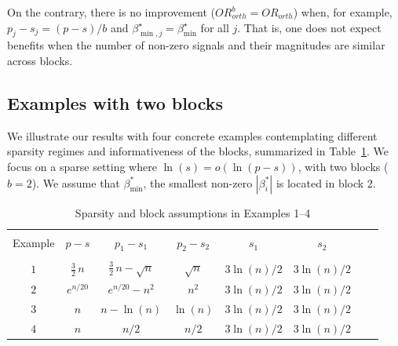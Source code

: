 \documentclass[aos]{imsart}
\theoremstyle{plain}
\begin{document}
On the contrary, there is no improvement 
(${OR}^b_{orth}={OR}_{orth}$) 
when, for example, %
$p_j-s_j=(p-s)/b$ 
 and $\beta^\star_{\min,j}=\beta_{\min}^\star$ for all $j$. That is, one does not expect benefits when the number of non-zero signals and their magnitudes are similar across blocks. \color{black}

\subsection{Examples with two blocks}\label{sec:examples}

We illustrate our results with four concrete examples contemplating different sparsity regimes and informativeness of the blocks, summarized in Table~\ref{tab:examples}. We focus on a sparse setting where $\ln(s)=o(\ln(p-s))$, with two blocks ($b=2$). We assume that $\beta_{\min}^*$, the smallest non-zero $|\beta_i^*|$ is located in block $2$. 

\begin{table}[ht]
\caption{Sparsity and block assumptions in Examples 1--4}
\label{tab:examples}
\begin{tabular}{@{}cccccccc@{}}
\hline \\[-1em]
Example & $p-s$ & $p_1-s_1$ & $p_2-s_2$ & $s_1$ 
& $s_2$\\[3pt]
\hline\\[-1em]
$1$    & $\frac{3}{2}\,n$ & $\frac{3}{2}\,n-\sqrt{n}$ & $\sqrt{n}$  & $3\ln(n)/2$  & $3\ln(n)/2$ \\[3pt]
$2$    & $e^{n/20}$ & $e^{n/20}-n^2$ & $n^2$  & $3\ln(n)/2$  & $3\ln(n)/2$   \\[3pt]
$3$    & $n$ & $n-\ln(n)$ & $\ln(n)$  & $3\ln(n)/2$  & $3\ln(n)/2$   \\[3pt]
$4$    & $n$ & $n/2$ & $n/2$  & $3\ln(n)/2$  & $3\ln(n)/2$ \\[3pt]
\hline
\end{tabular}
\end{table}
\end{document}
